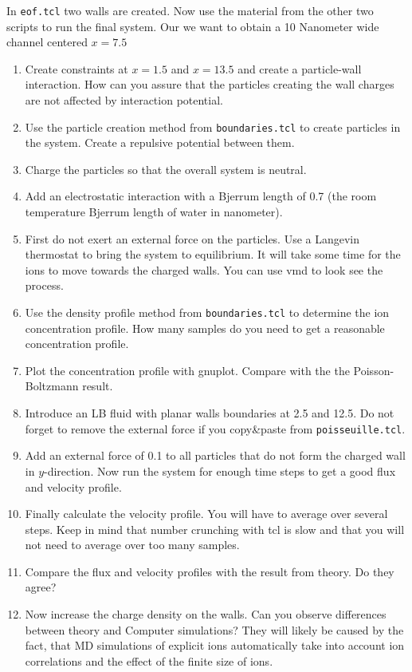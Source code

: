 In \lstinline|eof.tcl| two walls are created. Now use the material
from the other two scripts to run the final system.
Our we want to obtain a 10 Nanometer wide channel centered
$x=7.5$
\begin{enumerate}
  \item Create constraints at $x=1.5$ and $x=13.5$ and create 
    a particle-wall interaction. How can you assure that the 
    particles creating the wall charges are not affected by 
    interaction potential.
  \item
Use the particle
creation method from \lstinline|boundaries.tcl| to
create particles in the system. Create a repulsive potential between them.
  \item
Charge the particles so that
the overall system is neutral. 
  \item Add an electrostatic interaction with a Bjerrum length 
    of 0.7 (the room temperature Bjerrum length of water in nanometer).
  \item First do not exert an external force on the particles.
       Use a Langevin thermostat to bring the system to equilibrium.
       It will take some time for the ions to move towards the charged
       walls. You can use vmd to look see the process.
  \item
       Use the density profile method from \lstinline|boundaries.tcl|
       to determine the ion concentration profile. How many samples
       do you need to get a reasonable concentration profile.
   \item
     Plot the concentration profile with gnuplot. Compare with the
     the Poisson-Boltzmann result. 
   \item 
     Introduce an LB fluid with planar walls boundaries at 2.5 and 12.5. 
     Do not forget to remove the
     external force if you copy\&paste from \lstinline|poisseuille.tcl|.
   \item 
     Add an external force of 0.1 to all particles that do not form the
     charged wall in $y$-direction. Now run the system for enough time
     steps to get a good flux and velocity profile.
   \item 
     Finally calculate the velocity profile. You will have to 
     average over several steps. Keep in mind that number crunching
     with tcl is slow and that you will not need to average over too 
     many samples.
   \item 
     Compare the flux and velocity profiles with the result from
     theory. Do they agree?
   \item
     Now increase the charge density on the walls. Can you observe differences
     between theory and Computer simulations? They will likely be caused
     by the fact, that MD simulations of explicit ions automatically
     take into account ion correlations and the effect of the finite size
     of ions.
\end{enumerate}
